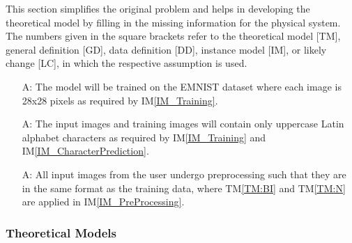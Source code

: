 \documentclass[12pt]{article}
\newcounter{assumpnum} %
\begin{document}

This section simplifies the original problem and helps in developing the
theoretical model by filling in the missing information for the physical system.
The numbers given in the square brackets refer to the theoretical model [TM],
general definition [GD], data definition [DD], instance model [IM], or likely
change [LC], in which the respective assumption is used.

\begin{itemize}

\item[A\refstepcounter{assumpnum}\theassumpnum \label{A_EMNIST}:] The model will be trained on the EMNIST dataset where each image is 28x28 pixels as required by IM\ref{IM_Training}.
\item[A\refstepcounter{assumpnum}\theassumpnum \label{A_LatinUppercase}:] The input images and training images will contain only uppercase Latin alphabet characters as required by IM\ref{IM_Training} and IM\ref{IM_CharacterPrediction}.
\item[A\refstepcounter{assumpnum}\theassumpnum \label{A_Preprocessing}:] All
input images from the user undergo preprocessing such that they are in the same
format as the training data, where TM\ref{TM:BI} and TM\ref{TM:N} are applied in
IM\ref{IM_PreProcessing}.

\end{itemize}

\subsubsection{Theoretical Models}\label{sec_theoretical}

\end{document}
